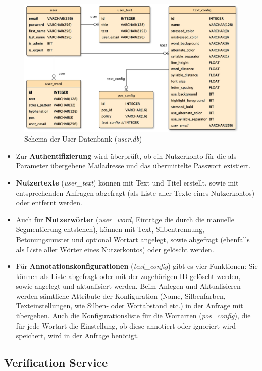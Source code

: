 \begin{figure}[h!]
	\centering
	\includegraphics[width=.8\linewidth]{figures/userservicedb}
	\caption{Schema der User Datenbank (\textit{user.db})}
	\label{fig:userdb}
\end{figure}

\begin{itemize}
	\item Zur \textbf{Authentifizierung} wird überprüft, ob ein Nutzerkonto für die als Parameter übergebene Mailadresse und das übermittelte Passwort existiert.
	
	\item \textbf{Nutzertexte} (\textit{user\_text}) können mit Text und Titel erstellt, sowie mit entsprechenden Anfragen abgefragt (als Liste aller Texte eines Nutzerkontos) oder entfernt werden.
	
	\item Auch für \textbf{Nutzerwörter} (\textit{user\_word}, Einträge die durch die manuelle Segmentierung entstehen), können mit Text, Silbentrennung, Betonungsmuster und optional Wortart angelegt, sowie abgefragt (ebenfalls als Liste aller Wörter eines Nutzerkontos) oder gelöscht werden.
	
	\item Für \textbf{Annotationskonfigurationen} (\textit{text\_config}) gibt es vier Funktionen: Sie können als Liste abgefragt oder mit der zugehörigen ID gelöscht werden, sowie angelegt und aktualisiert werden. Beim Anlegen und Aktualisieren werden sämtliche Attribute der Konfiguration (Name, Silbenfarben, Texteinstellungen, wie Silben- oder Wortabstand etc.) in der Anfrage mit übergeben. Auch die Konfigurationsliste für die Wortarten (\textit{pos\_config}), die für jede Wortart die Einstellung, ob diese annotiert oder ignoriert wird speichert, wird in der Anfrage benötigt.
\end{itemize}


\subsection{Verification Service}
\label{sec:verification-service}


